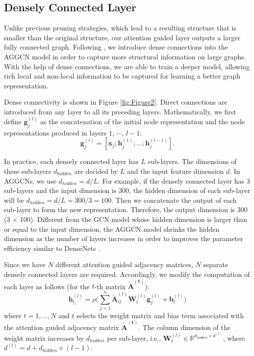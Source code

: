 \documentclass[11pt,a4paper]{article}
\begin{document}
\subsection{Densely Connected Layer}
\label{ssec:2.3}

Unlike previous pruning strategies, which lead to a resulting structure that is smaller than the original structure, our attention guided layer outputs a larger fully connected graph. Following \citep{dcgcnforgraph2seq19guo}, we introduce dense connections \citep{Huang2017DenselyCC} into the AGGCN model in order to capture more structural information on large graphs. With the help of dense connections, we are able to train a deeper model, allowing rich local and non-local information to be captured for learning a better graph representation.

Dense connectivity is shown in Figure \ref{fig:Figure2}. Direct connections are introduced from any layer to all its preceding layers. Mathematically, we first define $\mathbf{g}_{j}^{(l)}$ as the concatenation of the initial node representation and the node representations produced in layers $1$, $\cdots$, $l-1$:
\begin{equation}
\mathbf{g}_{j}^{(l)} = [\mathbf{x}_{j};\mathbf{h}_{j}^{(1)}; ... ;\mathbf{h}_{j}^{(l-1)}]. 
\end{equation}

In practice, each densely connected layer has $L$ sub-layers. The dimensions of these sub-layers $d_{hidden}$ are decided by $L$ and the input feature dimension $d$. In AGGCNs, we use $d_{hidden} = d/L$. For example, if the densely connected layer has 3 sub-layers and the input dimension is 300, the hidden dimension of each sub-layer will be $d_{hidden} = d/L = 300/3=100$. Then we concatenate the output of each sub-layer to form the new representation. Therefore, the output dimension is 300 (3 $\times$ 100). Different from the GCN model whose hidden dimension is larger than or equal to the input dimension, the AGGCN model shrinks the hidden dimension as the number of layers increases in order to improves the parameter efficiency similar to DenseNets \citep{Huang2017DenselyCC}.   

Since we have $N$ different attention guided adjacency matrices, $N$ separate densely connected layers are required. Accordingly, we modify the computation of each layer as follows (for the $t$-th matrix $\mathbf{\tilde{A}^{(t)}}$):
\begin{equation}
\mathbf{h}_{t_{i}}^{(l)} = \rho \Big(\sum_{j=1}^{n} \mathbf{\tilde{A}}_{ij}^{(t)} \mathbf{W}_{t}^{(l)} \mathbf{g}_{j}^{(l)} + \mathbf{b}_{t}^{(l)} \Big)
\end{equation}
where $t= 1, ..., N$ and $t$ selects the weight matrix and bias term associated with the attention guided adjacency matrix $\mathbf{\tilde{A}^{(t)}}$. The column dimension of the weight matrix increases by $d_{hidden}$ per sub-layer, i.e., $\mathbf{W}_{t}^{(l)} \in \mathbb{R}^{d_{hidden} \times d^{(l)}}$, where $ d^{(l)} = d+d_{hidden} \times (l-1)$. 
\end{document}
